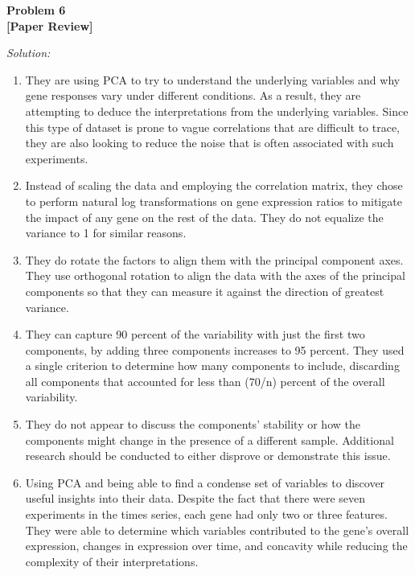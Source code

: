 \documentclass{article}
\newenvironment{problem}[2][Problem]
    { \begin{mdframed}[backgroundcolor=gray!20] \textbf{#1 #2} \\}
    {  \end{mdframed}}
\newenvironment{solution}
    {\textit{Solution:}}
    {}
\begin{document}
\newpage
\begin{problem}{6}
\textbf{[Paper Review]}
\end{problem}
\begin{solution}
\begin{enumerate}
\item They are using PCA to try to understand the underlying variables and why gene responses vary under different conditions. As a result, they are attempting to deduce the interpretations from the underlying variables. Since this type of dataset is prone to vague correlations that are difficult to trace, they are also looking to reduce the noise that is often associated with such experiments.
\item Instead of scaling the data and employing the correlation matrix, they chose to perform natural log transformations on gene expression ratios to mitigate the impact of any gene on the rest of the data. They do not equalize the variance to 1 for similar reasons.
\item They do rotate the factors to align them with the principal component axes. They use orthogonal rotation to align the data with the axes of the principal components so that they can measure it against the direction of greatest variance.
\item They can capture 90 percent of the variability with just the first two components, by adding three components increases to 95 percent. They used a single criterion to determine how many components to include, discarding all components that accounted for less than (70/n) percent of the overall variability.
\item They do not appear to discuss the components' stability or how the components might change in the presence of a different sample. Additional research should be conducted to either disprove or demonstrate this issue.
\item Using PCA and being able to find a condense set of variables to discover useful insights into their data. Despite the fact that there were seven experiments in the times series, each gene had only two or three features. They were able to determine which variables contributed to the gene's overall expression, changes in expression over time, and concavity while reducing the complexity of their interpretations.
\end{enumerate}
\end{solution}
\end{document}
